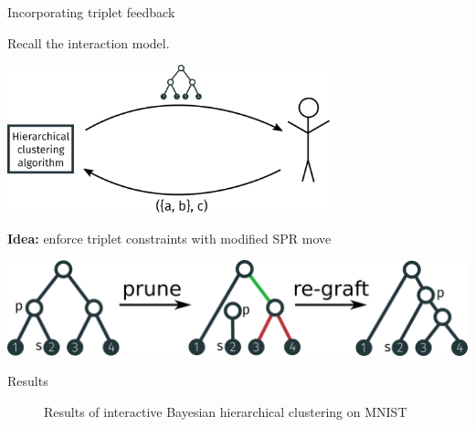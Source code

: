 \documentclass[10pt, compress]{beamer}
\begin{document}
\begin{frame}{Incorporating triplet feedback}

  Recall the interaction model.

  \begin{center}
    \includegraphics[width=0.7\textwidth]{img/interaction-3}
  \end{center}
  \pause

  \textbf{Idea:}  enforce triplet constraints with
  modified SPR move

  \pause

  \begin{center}
    \includegraphics[width=\textwidth]{img/cspr-animation}
  \end{center}
\end{frame}

\begin{frame}{Results}
  \centering
  \vspace{10pt}
  \begin{figure}
  \caption*{Results of interactive Bayesian hierarchical clustering on MNIST}
  \end{figure}
\end{frame}
\end{document}
